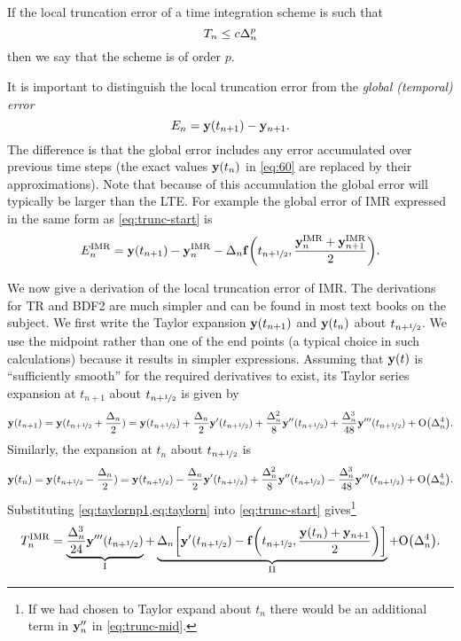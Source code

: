 If the local truncation error of a time integration scheme is such that 
\begin{equation}
  T_n \leq c \Delta_{n}^p
\end{equation}
then we say that the scheme is of order $p$.

It is important to distinguish the local truncation error from the \emph{global (temporal) error}
\begin{equation}
  \label{eq:global-temporal-error}
    E_n = \yv(t_{n+1}) - \yv_{n+1}.
\end{equation}
The difference is that the global error includes any error accumulated over previous time steps (\ie the exact values $\mathbf{y}(t_n)$ in \cref{eq:60} are replaced by their approximations).
Note that because of this accumulation the global error will typically be larger than the LTE.
For example the global error of IMR expressed in the same form as \cref{eq:trunc-start} is
\begin{equation}
  E_n^{\text{IMR}} =  \mathbf{y}(t_{n+1}) - \mathbf{y}_n^{\text{IMR}} - \Delta_{n} {\mathbf{f}{\left(  t_{n+\nicefrac{1}{2}}, \frac{\mathbf{y}_n^{\text{IMR}} + \mathbf{y}_{n+1}^{\text{IMR}}}{2}  \right)}}.
\end{equation}

We now give a derivation of the local truncation error of IMR. 
The derivations for TR and BDF2 are much simpler and can be found in most text books on the subject.
We first write the Taylor expansion $\mathbf{y}(t_{n+1})$ and $\mathbf{y}(t_{n})$ about $t_{n+\nicefrac{1}{2}}$.
We use the midpoint rather than one of the end points (a typical choice in such calculations) because it results in simpler expressions.
Assuming that $\mathbf{y}(t)$ is ``sufficiently smooth'' for the required derivatives to exist, its Taylor series expansion at $t_{n+1}$ about $t_{n+\nicefrac{1}{2}}$ is given by
\begin{equation}
  \yv(t_{n+1}) = \yv(\thf + \frac{\dtn}{2}) = \yvhf + \frac{\dtn}{2} \yvhf['] 
  + \frac{\dtn^2}{8} \yvhf['']
  + \frac{\dtn^3}{48} \yvhf[''']
  + \order{\dtn^4}.
  \label{eq:taylornp1}
\end{equation}
Similarly, the expansion at $t_n$ about $t_{n+\nicefrac{1}{2}}$ is
\begin{equation}
  \yv(t_n) = \yv(\thf - \frac{\dtn}{2}) = \yvhf - \frac{\dtn}{2} \yvhf['] 
  + \frac{\dtn^2}{8} \yvhf[''] 
  - \frac{\dtn^3}{48} \yvhf['''] 
  + \order{\dtn^4}.
  \label{eq:taylorn}
\end{equation}
Substituting \cref{eq:taylornp1,eq:taylorn} into \cref{eq:trunc-start} gives\footnote{If we had chosen to Taylor expand about $t_n$ there would be an additional term in $\mathbf{y}_n''$ in \cref{eq:trunc-mid}.}
\begin{equation}
  \lte^\imr = \underbrace{\frac{\dtn^3}{24} \yvhf[''']}_{\text{I}}
  + \underbrace{\dtn\bigs{ \yvhf['] - \ffv{\thf, \frac{\yv(t_n) + \yv_{n+1}}{2}} }}_{\text{II}}
  + \order{\dtn^4}.
  \label{eq:trunc-mid}
\end{equation}

